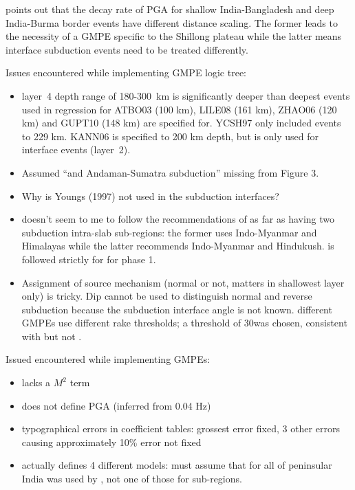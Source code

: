 \documentclass{article}
\begin{document}
\cite{sharma2009ground} points out that the decay rate of PGA for shallow India-Bangladesh and deep India-Burma border events have different distance scaling.
The former leads to the necessity of a GMPE specific to the Shillong plateau \cite{nath2012ground} while the latter means interface subduction events need to be treated differently.

Issues encountered while implementing GMPE logic tree:
\begin{itemize}
\item layer~4 depth range of 180-300~km is significantly deeper than deepest events used in regression for ATBO03 (100 km), LILE08 (161 km), ZHAO06 (120 km) and GUPT10 (148 km) are specified for.
YCSH97 only included events to 229 km.
KANN06 is specified to 200 km depth, but is only used for interface events (layer~2).
\item Assumed “and Andaman-Sumatra subduction” missing from Figure 3.
\item Why is Youngs (1997) not used in the subduction interfaces?
\item \cite{nath2012probabilistic} doesn't seem to me to follow the recommendations of \cite{nath2011peak} as far as having two subduction intra-slab sub-regions: the former uses Indo-Myanmar and Himalayas while the latter recommends Indo-Myanmar and Hindukush.
\cite{nath2012probabilistic} is followed strictly for for phase 1.
\item Assignment of source mechanism (normal or not, matters in shallowest layer only) is tricky.
 Dip cannot be used to distinguish normal and reverse subduction because the subduction interface angle is not known.
different GMPEs use different rake thresholds; a threshold of 30\degree\space was chosen, consistent with \cite{boore2008ground, campbell2008nga} but not \cite{zhao2006attenuation}.
\end{itemize}

Issued encountered while implementing GMPEs:

\cite{sharma2009ground}
\begin{itemize}
\item lacks a $M^2$ term \cite{cotton2006criteria}
\item does not define PGA (inferred from 0.04 Hz)
\end{itemize}

\cite{raghukanth2007estimation}
\begin{itemize}
\item typographical errors in coefficient tables: grossest error fixed, 3 other errors causing approximately 10\% error not fixed
\item actually defines 4 different models: must assume that for all of peninsular India was used by \cite{nath2012probabilistic}, not one of those for sub-regions.
\end{itemize}
\end{document}
